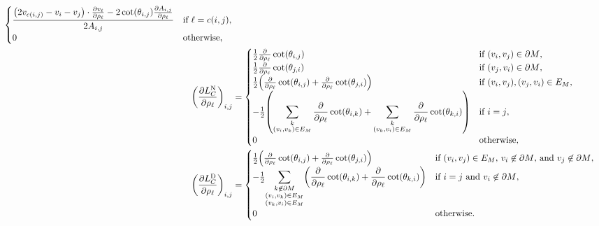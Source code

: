 \begin{align*}
\begin{cases}
		\displaystyle\frac{\pof{2v_{c\pof{i, j}} - v_i - v_j} \cdot \frac{\partial v_\ell}{\partial \rho_\ell} - 2\cot\pof{\theta_{i, j}}\frac{\partial A_{i, j}}{\partial \rho_\ell}}{2A_{i, j}} & \text{if \(\ell = c\pof{i, j}\)}, \\
		0 & \text{otherwise},
	\end{cases} \\
	\pof{\frac{\partial L_C^{\text{N}}}{\partial \rho_\ell}}_{i, j} &= \begin{cases}
		\frac{1}{2}\frac{\partial}{\partial \rho_\ell}\cot\pof{\theta_{i, j}} & \text{if \(\pof{v_i, v_j} \in \partial M\)}, \\
		\frac{1}{2}\frac{\partial}{\partial \rho_\ell}\cot\pof{\theta_{j, i}} & \text{if \(\pof{v_j, v_i} \in \partial M\)}, \\
		\frac{1}{2}\pof{\frac{\partial}{\partial \rho_\ell}\cot\pof{\theta_{i, j}} + \frac{\partial}{\partial \rho_\ell}\cot\pof{\theta_{j, i}}} & \text{if \(\pof{v_i, v_j}, \pof{v_j, v_i} \in E_M\)}, \\
		-\frac{1}{2}\pof{\displaystyle\sum_{\substack{k \\ \pof{v_i, v_k} \in E_M}}\frac{\partial}{\partial \rho_\ell}\cot\pof{\theta_{i, k}} + \sum_{\substack{k \\ \pof{v_k, v_i} \in E_M}}\frac{\partial}{\partial \rho_\ell}\cot\pof{\theta_{k, i}}} & \text{if \(i = j\)}, \\
		0 & \text{otherwise},
	\end{cases} \\
	\pof{\frac{\partial L_C^{\text{D}}}{\partial \rho_\ell}}_{i, j} &= \begin{cases}
		\frac{1}{2}\pof{\frac{\partial}{\partial \rho_\ell}\cot\pof{\theta_{i, j}} + \frac{\partial}{\partial \rho_\ell}\cot\pof{\theta_{j, i}}} & \text{if \(\pof{v_i, v_j} \in E_M\), \(v_i \not\in \partial M\), and \(v_j \not\in \partial M\)}, \\
		-\frac{1}{2}{\displaystyle\sum_{\substack{k \not\in \partial M \\ \pof{v_i, v_k} \in E_M \\ \pof{v_k, v_i} \in E_M}}\pof{\frac{\partial}{\partial \rho_\ell}\cot\pof{\theta_{i, k}} + \frac{\partial}{\partial \rho_\ell}\cot\pof{\theta_{k, i}}}} & \text{if \(i = j\) and \(v_i \not\in \partial M\)}, \\
		0 & \text{otherwise}.
	\end{cases}
\end{align*}

